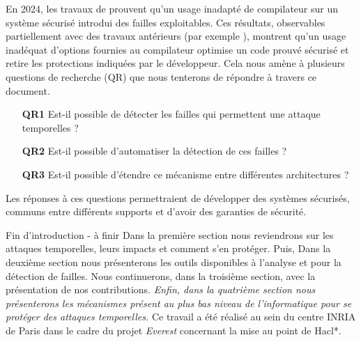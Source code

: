 En 2024, les travaux de \citeauthor{schneider2024breakingbadcompilersbreak} \cite{schneider2024breakingbadcompilersbreak} prouvent qu'un usage inadapté de compilateur sur un système sécurisé introdui des failles exploitables. Ces résultats, observables partiellement avec des travaux antérieurs (par exemple \cite{binsecRel2019}), montrent qu'un usage inadéquat d'options fournies au compilateur optimise un code prouvé sécurisé et retire les protections indiquées par le développeur. Cela nous amène à plusieurs questions de recherche (QR) que nous tenterons de répondre à travers ce document.
\begin{enumerate}
    \item[\textbf{QR1}] Est-il possible de détecter les failles qui permettent une attaque temporelles ?
    \item[\textbf{QR2}] Est-il possible d'automatiser la détection de ces failles ?
    \item[\textbf{QR3}] Est-il possible d'étendre ce mécanisme entre différentes architectures ?
\end{enumerate}

Les réponses à ces questions permettraient de développer des systèmes sécurisés, communs entre différents supports et d'avoir des garanties de sécurité.

\begin{Acorriger}{Fin d'introduction - à finir}
    Dans la première section nous reviendrons sur les attaques temporelles, leurs impacts et comment s'en protéger. Puis, Dans la deuxième section nous présenterons les outils disponibles à l'analyse et pour la détection de failles. Nous continuerons, dans la troisième section, avec la présentation de nos contributions. \textit{Enfin, dans la quatrième section nous présenterons les mécanismes présent au plus bas niveau de l'informatique pour se protéger des attaques temporelles.}\medbreak
    Ce travail a été réalisé au sein du centre INRIA de Paris dans le cadre du projet \textit{Everest} concernant la mise au point de Hacl*.
    
\end{Acorriger}
